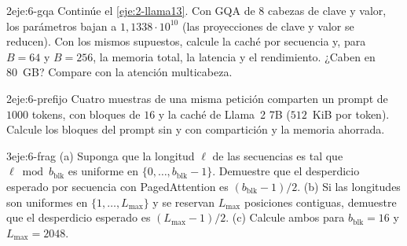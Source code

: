 \begin{ejercicio}{2}{eje:6-gqa}
Continúe el \cref{eje:2-llama13}. Con GQA de $8$ cabezas de clave y valor, los parámetros bajan a $1{,}1338\cdot 10^{10}$ (las proyecciones de clave y valor se reducen). Con los mismos supuestos, calcule la caché por secuencia y, para $B=64$ y $B=256$, la memoria total, la latencia y el rendimiento. ¿Caben en 80~GB? Compare con la atención multicabeza.
\end{ejercicio}

\begin{ejercicio}{2}{eje:6-prefijo}
Cuatro muestras de una misma petición comparten un prompt de $1000$ tokens, con bloques de $16$ y la caché de Llama~2 7B ($512$~KiB por token). Calcule los bloques del prompt sin y con compartición y la memoria ahorrada.
\end{ejercicio}

\begin{ejercicio}{3}{eje:6-frag}
(a) Suponga que la longitud $\ell$ de las secuencias es tal que $\ell\bmod b_{\mathrm{blk}}$ es uniforme en $\{0,\dots,b_{\mathrm{blk}}-1\}$. Demuestre que el desperdicio esperado por secuencia con PagedAttention es $(b_{\mathrm{blk}}-1)/2$. (b) Si las longitudes son uniformes en $\{1,\dots,L_{\max}\}$ y se reservan $L_{\max}$ posiciones contiguas, demuestre que el desperdicio esperado es $(L_{\max}-1)/2$. (c) Calcule ambos para $b_{\mathrm{blk}}=16$ y $L_{\max}=2048$.
\end{ejercicio}
